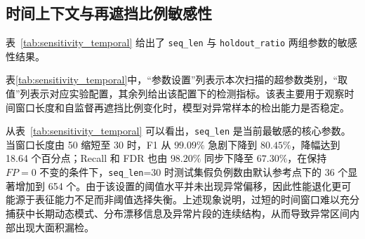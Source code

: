 \documentclass[bachelor, vlined]{DissertUESTC}
\begin{document}
    \subsection{时间上下文与再遮挡比例敏感性}

    表~\ref{tab:sensitivity_temporal} 给出了 \texttt{seq\_len} 与 \texttt{holdout\_ratio} 两组参数的敏感性结果。

    \begin{table}[htbp]
        \centering
        \caption{时间上下文与再遮挡比例的参数敏感性结果}
        \label{tab:sensitivity_temporal}
        \small
        \setlength{\tabcolsep}{5pt}
        \renewcommand{\arraystretch}{1.15}
    \end{table}

    表\ref{tab:sensitivity_temporal}中，“参数设置”列表示本次扫描的超参数类别，“取值”列表示对应实验配置，其余列给出该配置下的检测指标。该表主要用于观察时间窗口长度和自监督再遮挡比例变化时，模型对异常样本的检出能力是否稳定。

    从表~\ref{tab:sensitivity_temporal} 可以看出，\texttt{seq\_len} 是当前最敏感的核心参数。当窗口长度由 50 缩短至 30 时，F1 从 \(99.09\%\) 急剧下降到 \(80.45\%\)，降幅达到 18.64 个百分点；Recall 和 FDR 也由 \(98.20\%\) 同步下降至 \(67.30\%\)，在保持 \(FP=0\) 不变的条件下，\texttt{seq\_len}=30 时测试集假负例数由默认参考点下的 36 个显著增加到 654 个。由于该设置的阈值水平并未出现异常偏移，因此性能退化更可能源于表征能力不足而非阈值选择失衡。上述现象说明，过短的时间窗口难以充分捕获中长期动态模式、分布漂移信息及异常片段的连续结构，从而导致异常区间内部出现大面积漏检。
\end{document}
